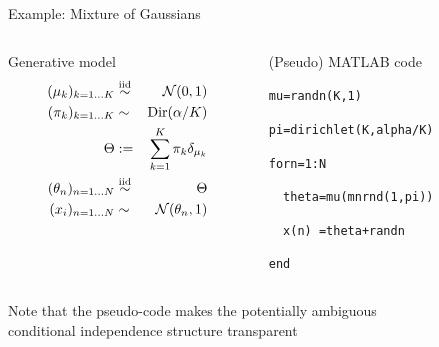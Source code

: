 \begin{frame}{Example: Mixture of Gaussians}
  \begin{columns}
    \begin{column}{.47\textwidth}
      \begin{block}{Generative model}
        \begin{eqnarray*}
          (\mu_k)_{k=1\ldots K} & \stackrel{\mathrm{iid}}{\sim} & \mathcal{N}(0, 1) \\
          (\pi_k)_{k=1\ldots K} & \sim & \textrm{Dir}(\alpha/K) \\
          \Theta & := & \sum_{k=1}^K \pi_k \delta_{\mu_k} \\
          (\theta_n)_{n=1\ldots N} & \stackrel{\mathrm{iid}}{\sim} & \Theta \\
          (x_i)_{n=1\ldots N} & \sim & \mathcal{N}(\theta_n, 1)
        \end{eqnarray*}
      \end{block}
    \end{column}
    \begin{column}{.47\textwidth}
      \begin{block}{(Pseudo) MATLAB code}
        \vspace{0.75\baselineskip}
        \begin{alltt}
          mu = randn(K,1)

          pi = dirichlet(K, alpha/K)

          for n = 1:N
            
          \ \ theta = mu(mnrnd(1,pi))
          
          \ \ x(n) \ = theta + randn
            
          end
        \end{alltt}
        \vspace{0.75\baselineskip}
      \end{block}
    \end{column}
  \end{columns}
  \vspace{\baselineskip}
  \begin{center}
  {
    {Note that the pseudo-code makes the potentially ambiguous\\conditional independence structure transparent}
  }	
  \end{center}
  \vspace{-1\baselineskip}
\end{frame}


